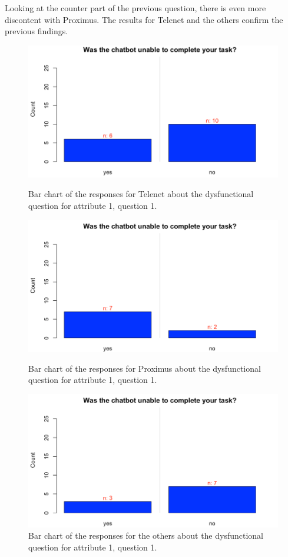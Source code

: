 Looking at the counter part of the previous question, there is even more discontent with Proximus. The results for Telenet and the others confirm the previous findings.\\
\begin{figure}[!htb]
	\includegraphics[width=\linewidth]{../LaTeX/Figures/Comparative/DQ1T.png}
	\caption{Bar chart of the responses for Telenet about the dysfunctional question for attribute 1, question 1.}\label{fig:DQ1T}
	\endminipage\hfill
	\includegraphics[width=\linewidth]{../LaTeX/Figures/Comparative/DQ1P.png}
	\caption{Bar chart of the responses for Proximus about the dysfunctional question for attribute 1, question 1.}\label{fig:DQ1P}
	\endminipage\hfill
	\includegraphics[width=\linewidth]{../LaTeX/Figures/Comparative/DQ1O.png}
	\caption{Bar chart of the responses for the others about the dysfunctional question for attribute 1, question 1.}\label{fig:DQ1O}
	\endminipage\hfill
\end{figure}

